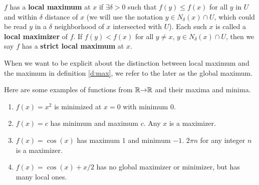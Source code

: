 \begin{definition}\label{d:lmax}
  $f$ has a \textbf{local maximum} at $x$ if $\exists \delta > 0$ such
  that $f(y) \leq f(x)$ for all $y$ in $U$ and within $\delta$
  distance of $x$ (we will use the notation
  $y \in N_\delta(x) \cap U$, which could be read $y$ in a $\delta$
  neighborhood of $x$ intersected with $U$). Each such $x$ is called a
  \textbf{local maximizer} of $f$. If $f(y) < f(x)$ for all
  $y \neq x$, $y \in N_\delta(x) \cap U$, then we say $f$ has a
  \textbf{strict local maximum} at $x$.
\end{definition}
When we want to be explicit about the distinction between local
maximum and the maximum in definition \ref{d:max}, we refer to the
later as the global maximum.  
\begin{example}
  Here are some examples of functions from $\mathbb{R} {\rightarrow} \mathbb{R}$ and their
  maxima and minima.
  \begin{enumerate}
  \item $f(x) = x^2$ is minimized at $x = 0$ with minimum $0$. 
  \item $f(x) = c$ has minimum and maximum $c$. Any $x$ is a
    maximizer.
  \item $f(x) = \cos(x)$ has maximum $1$ and minimum $-1$. $2\pi n$
    for any integer $n$ is a maximizer. 
  \item $f(x) = \cos(x) + x/2$ has no global maximizer or minimizer,
    but has many local ones.
  \end{enumerate}
\end{example}

